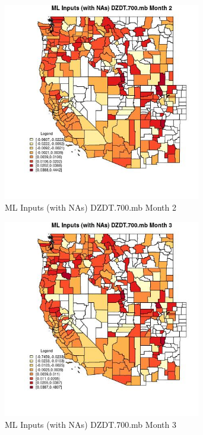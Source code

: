 \begin{figure} 
\centering  
\includegraphics[width=0.77\textwidth]{Code_Outputs/Report_ML_input_PM25_Step4_part_f_de_duplicated_aveswNAs_CountyDZDT700mbmedianMonth2.jpg} 
\caption{\label{fig:Report_ML_input_PM25_Step4_part_f_de_duplicated_aveswNAsCountyDZDT700mbmedianMonth2}ML Inputs (with NAs) DZDT.700.mb Month 2} 
\end{figure} 
 

\clearpage 

\begin{figure} 
\centering  
\includegraphics[width=0.77\textwidth]{Code_Outputs/Report_ML_input_PM25_Step4_part_f_de_duplicated_aveswNAs_CountyDZDT700mbmedianMonth3.jpg} 
\caption{\label{fig:Report_ML_input_PM25_Step4_part_f_de_duplicated_aveswNAsCountyDZDT700mbmedianMonth3}ML Inputs (with NAs) DZDT.700.mb Month 3} 
\end{figure} 
 

